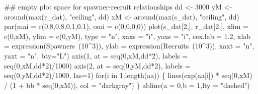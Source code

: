 \documentclass[11pt,]{article}
\newenvironment{Shaded}{}{}
\newcommand{\CommentTok}[1]{\textcolor[rgb]{0.00,0.50,0.00}{#1}}
\newcommand{\ControlFlowTok}[1]{\textcolor[rgb]{0.00,0.00,1.00}{#1}}
\newcommand{\DataTypeTok}[1]{#1}
\newcommand{\DecValTok}[1]{#1}
\newcommand{\FloatTok}[1]{#1}
\newcommand{\KeywordTok}[1]{\textcolor[rgb]{0.00,0.00,1.00}{#1}}
\newcommand{\NormalTok}[1]{#1}
\newcommand{\OperatorTok}[1]{#1}
\newcommand{\StringTok}[1]{\textcolor[rgb]{0.00,0.50,0.50}{#1}}
\begin{document}
\begin{Shaded}
\begin{Highlighting}[]
\CommentTok{## empty plot space for spawner-recruit relationships}
\NormalTok{dd <-}\StringTok{ }\DecValTok{3000}
\NormalTok{yM <-}\StringTok{ }\KeywordTok{around}\NormalTok{(}\KeywordTok{max}\NormalTok{(r_dat), }\StringTok{"ceiling"}\NormalTok{, dd)}
\NormalTok{xM <-}\StringTok{ }\KeywordTok{around}\NormalTok{(}\KeywordTok{max}\NormalTok{(s_dat), }\StringTok{"ceiling"}\NormalTok{, dd)}
\KeywordTok{par}\NormalTok{(}\DataTypeTok{mai =} \KeywordTok{c}\NormalTok{(}\FloatTok{0.8}\NormalTok{,}\FloatTok{0.8}\NormalTok{,}\FloatTok{0.1}\NormalTok{,}\FloatTok{0.1}\NormalTok{), }\DataTypeTok{omi =} \KeywordTok{c}\NormalTok{(}\DecValTok{0}\NormalTok{,}\DecValTok{0}\NormalTok{,}\DecValTok{0}\NormalTok{,}\DecValTok{0}\NormalTok{))}
\KeywordTok{plot}\NormalTok{(s_dat[}\DecValTok{2}\NormalTok{,], r_dat[}\DecValTok{2}\NormalTok{,], }\DataTypeTok{xlim =} \KeywordTok{c}\NormalTok{(}\DecValTok{0}\NormalTok{,xM), }\DataTypeTok{ylim =} \KeywordTok{c}\NormalTok{(}\DecValTok{0}\NormalTok{,yM), }\DataTypeTok{type =} \StringTok{"n"}\NormalTok{,}
     \DataTypeTok{xaxs =} \StringTok{"i"}\NormalTok{, }\DataTypeTok{yaxs =} \StringTok{"i"}\NormalTok{, }\DataTypeTok{cex.lab =} \FloatTok{1.2}\NormalTok{,}
     \DataTypeTok{xlab =} \KeywordTok{expression}\NormalTok{(Spawners}\OperatorTok{~}\NormalTok{(}\DecValTok{10}\OperatorTok{^}\DecValTok{3}\NormalTok{)),}
     \DataTypeTok{ylab =} \KeywordTok{expression}\NormalTok{(Recruits}\OperatorTok{~}\NormalTok{(}\DecValTok{10}\OperatorTok{^}\DecValTok{3}\NormalTok{)),}
     \DataTypeTok{xaxt =} \StringTok{"n"}\NormalTok{, }\DataTypeTok{yaxt =} \StringTok{"n"}\NormalTok{, }\DataTypeTok{bty=}\StringTok{"L"}\NormalTok{)}
\KeywordTok{axis}\NormalTok{(}\DecValTok{1}\NormalTok{, }\DataTypeTok{at =} \KeywordTok{seq}\NormalTok{(}\DecValTok{0}\NormalTok{,xM,dd}\OperatorTok{*}\DecValTok{2}\NormalTok{), }\DataTypeTok{labels =} \KeywordTok{seq}\NormalTok{(}\DecValTok{0}\NormalTok{,xM,dd}\OperatorTok{*}\DecValTok{2}\NormalTok{)}\OperatorTok{/}\DecValTok{1000}\NormalTok{)}
\KeywordTok{axis}\NormalTok{(}\DecValTok{2}\NormalTok{, }\DataTypeTok{at =} \KeywordTok{seq}\NormalTok{(}\DecValTok{0}\NormalTok{,yM,dd}\OperatorTok{*}\DecValTok{2}\NormalTok{), }\DataTypeTok{labels =} \KeywordTok{seq}\NormalTok{(}\DecValTok{0}\NormalTok{,yM,dd}\OperatorTok{*}\DecValTok{2}\NormalTok{)}\OperatorTok{/}\DecValTok{1000}\NormalTok{, }\DataTypeTok{las=}\DecValTok{1}\NormalTok{)}
\ControlFlowTok{for}\NormalTok{(i }\ControlFlowTok{in} \DecValTok{1}\OperatorTok{:}\KeywordTok{length}\NormalTok{(aa)) \{}
  \KeywordTok{lines}\NormalTok{(}\KeywordTok{exp}\NormalTok{(aa[i]) }\OperatorTok{*}\StringTok{ }\KeywordTok{seq}\NormalTok{(}\DecValTok{0}\NormalTok{,xM) }\OperatorTok{/}\StringTok{ }\NormalTok{(}\DecValTok{1} \OperatorTok{+}\StringTok{ }\NormalTok{bb }\OperatorTok{*}\StringTok{ }\KeywordTok{seq}\NormalTok{(}\DecValTok{0}\NormalTok{,xM)),}
        \DataTypeTok{col =} \StringTok{"darkgray"}\NormalTok{)}
\NormalTok{\}}
\KeywordTok{abline}\NormalTok{(}\DataTypeTok{a =} \DecValTok{0}\NormalTok{,}\DataTypeTok{b =} \DecValTok{1}\NormalTok{,}\DataTypeTok{lty =} \StringTok{"dashed"}\NormalTok{)}


\end{Highlighting}
\end{Shaded}
\end{document}
